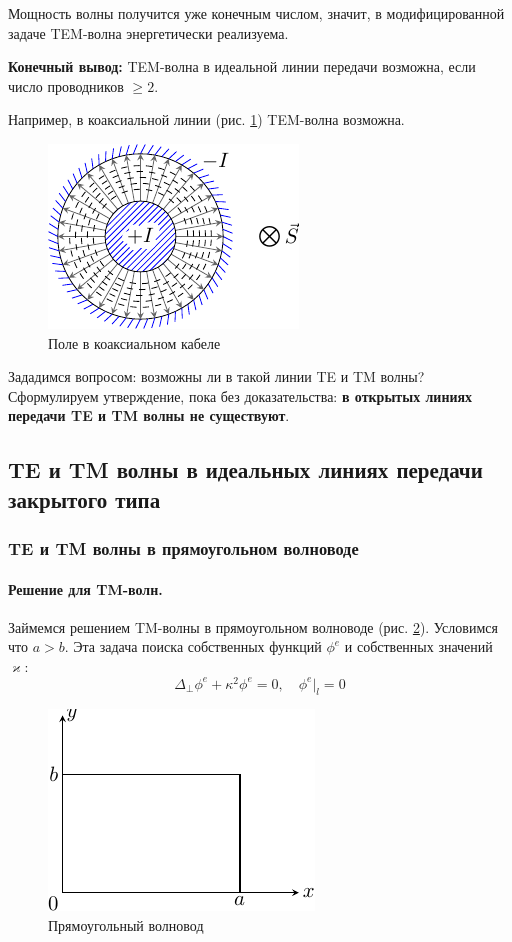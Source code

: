 Мощность волны получится уже конечным числом, значит, в модифицированной задаче TEM-волна энергетически реализуема.

\textbf{Конечный вывод:} TEM-волна в идеальной линии передачи возможна, если число проводников $\geq 2$.

Например, в коаксиальной линии (рис. \ref{fig:lect4:6}) TEM-волна возможна.

\begin{figure}[H]
	\centering
	\includegraphics[scale=1.5]{img/lect4_ris6}
	\caption{Поле в коаксиальном кабеле}
	\label{fig:lect4:6}
\end{figure}

Зададимся вопросом: возможны ли в такой линии TE и TM волны? Сформулируем утверждение, пока без доказательства: \textbf{в открытых линиях передачи TE и TM волны не существуют}.

\subsection{TE и TM волны в идеальных линиях передачи закрытого типа}


\subsubsection{TE и TM волны в прямоугольном волноводе}

\paragraph{Решение для TM-волн.} Займемся решением TM-волны в прямоугольном волноводе (рис. \ref{fig:lect4:7}). Условимся что $a>b$. Эта задача поиска собственных функций $\phi^e$ и собственных значений $\varkappa$:
\begin{equation}
	\Delta_\perp \phi^e+\kappa^2\phi^e=0, \quad \phi^e|_l=0
\end{equation}

\begin{figure}[h!]
	\centering
	\includegraphics[scale=1.5]{img/lect4_ris7}
	\caption{Прямоугольный волновод}
	\label{fig:lect4:7}
\end{figure}

